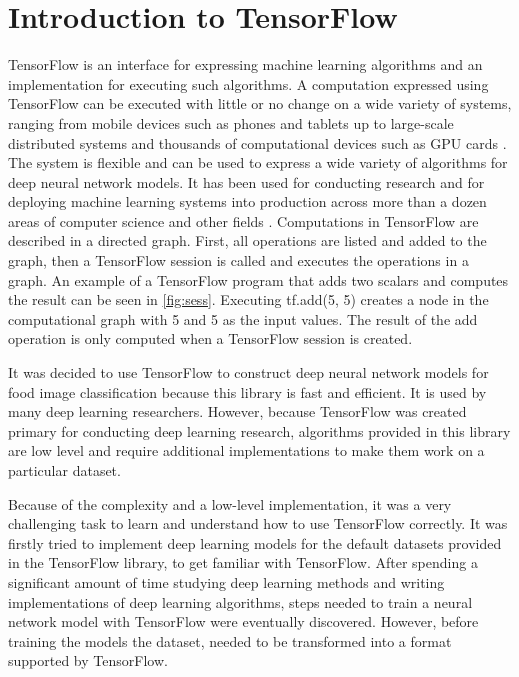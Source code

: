 \section{Introduction to TensorFlow}

TensorFlow is an interface for expressing machine learning algorithms and an implementation for executing such algorithms. A computation expressed using TensorFlow can be executed with little or no change on a wide variety of systems, ranging from mobile devices such as phones and tablets up to large-scale distributed systems and thousands of computational devices such as GPU cards \cite{abadi2016tensorflow}. The system is flexible and can be used to express a wide variety of algorithms for deep neural network models. It has been used for conducting research and for deploying machine learning systems into production across more than a dozen areas of computer science and other fields \cite{abadi2016tensorflow}. Computations in TensorFlow are described in a directed graph. First, all operations are listed and added to the graph, then a TensorFlow session is called and executes the operations in a graph. An example of a TensorFlow program that adds two scalars and computes the result can be seen in \autoref{fig:sess}. Executing tf.add(5, 5) creates a node in the computational graph with 5 and 5 as the input values. The result of the add operation is only computed when a TensorFlow session is created. 

It was decided to use TensorFlow to construct deep neural network models for food image classification because this library is fast and efficient. It is used by many deep learning researchers. However, because TensorFlow was created primary for conducting deep learning research, algorithms provided in this library are low level and require additional implementations to make them work on a particular dataset.

Because of the complexity and a low-level implementation, it was a very challenging task to learn and understand how to use TensorFlow correctly. It was firstly tried to implement deep learning models for the default datasets provided in the TensorFlow library, to get familiar with TensorFlow. After spending a significant amount of time studying deep learning methods and writing implementations of deep learning algorithms, steps needed to train a neural network model with TensorFlow were eventually discovered. However, before training the models the dataset, needed to be transformed into a format supported by TensorFlow. 

